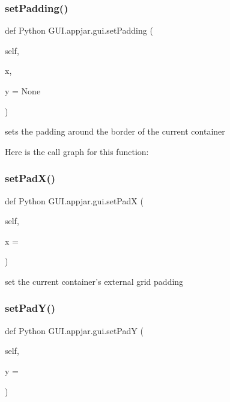 \begin{DoxyVerb}
\subsubsection{\texorpdfstring{set\+Padding()}{setPadding()}}
{\footnotesize\ttfamily def Python G\+U\+I.\+appjar.\+gui.\+set\+Padding (\begin{DoxyParamCaption}\item[{}]{self,  }\item[{}]{x,  }\item[{}]{y = {\ttfamily None} }\end{DoxyParamCaption})}

\begin{DoxyVerb}sets the padding around the border of the current container \end{DoxyVerb}
 Here is the call graph for this function\+:
\mbox{\label{class_python_01_g_u_i_1_1appjar_1_1gui_af09b14407e7f72771380bda999c01122}} 
\subsubsection{\texorpdfstring{set\+Pad\+X()}{setPadX()}}
{\footnotesize\ttfamily def Python G\+U\+I.\+appjar.\+gui.\+set\+PadX (\begin{DoxyParamCaption}\item[{}]{self,  }\item[{}]{x = {} }\end{DoxyParamCaption})}

\begin{DoxyVerb}set the current container's external grid padding \end{DoxyVerb}
 \mbox{\label{class_python_01_g_u_i_1_1appjar_1_1gui_add087258845f0ee6342f6fd23e0a0667}} 
\subsubsection{\texorpdfstring{set\+Pad\+Y()}{setPadY()}}
{\footnotesize\ttfamily def Python G\+U\+I.\+appjar.\+gui.\+set\+PadY (\begin{DoxyParamCaption}\item[{}]{self,  }\item[{}]{y = {} }\end{DoxyParamCaption})}


\end{DoxyVerb}
